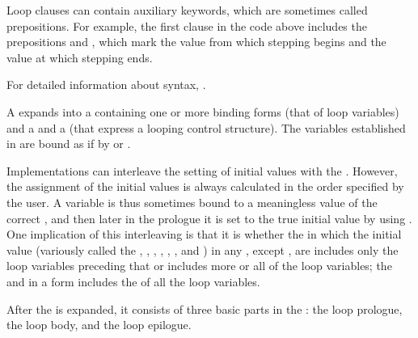 Loop clauses can contain auxiliary keywords, which are sometimes
called prepositions.  For example, the first clause in the code
above includes the prepositions  and , 
which mark the value from which stepping begins and the value at which stepping
ends.

For detailed information about  syntax,
.

\endsubsubsection%
 


A   expands into a  containing
one or more binding forms (that   of loop variables)
and a  and a  (that express a looping control 
structure). The variables established in  are bound as
if by  or .  

Implementations can interleave the setting of initial values with the .  
However, the assignment of the initial values is always calculated in the order
specified by the user.  A variable is thus sometimes bound to a meaningless value 
of the correct , and then later in the prologue it is set to the true
initial value by using .
One implication of this interleaving is that it is 
whether the  in which the initial value 
(variously called the , , , ,
 , , and ) in any ,
except ,
are  includes only the loop variables preceding that 
or includes more or all of the loop variables;
the  and  in a  form
includes the  of all the loop variables.
 
After the  is expanded, it consists of three basic parts in the 
: 
      the loop prologue,
      the loop body,
  and the loop epilogue.

